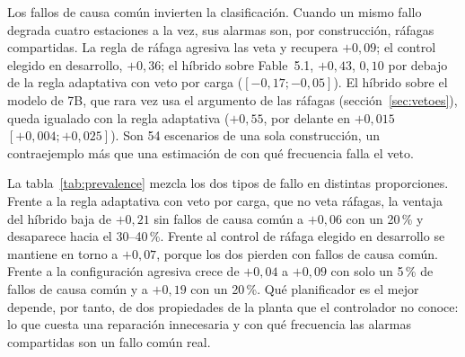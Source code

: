 \documentclass[preprint,11pt]{elsarticle}
\begin{document}
Los fallos de causa común invierten la clasificación. Cuando un mismo fallo degrada cuatro estaciones a la vez, sus alarmas son, por construcción, ráfagas compartidas. La regla de ráfaga agresiva las veta y recupera $+0{,}09$; el control elegido en desarrollo, $+0{,}36$; el híbrido sobre Fable~5.1, $+0{,}43$, $0{,}10$ por debajo de la regla adaptativa con veto por carga ($[-0{,}17; -0{,}05]$). El híbrido sobre el modelo de 7B, que rara vez usa el argumento de las ráfagas (sección~\ref{sec:vetoes}), queda igualado con la regla adaptativa ($+0{,}55$, por delante en $+0{,}015$ $[+0{,}004; +0{,}025]$). Son 54 escenarios de una sola construcción, un contraejemplo más que una estimación de con qué frecuencia falla el veto.

La tabla~\ref{tab:prevalence} mezcla los dos tipos de fallo en distintas proporciones. Frente a la regla adaptativa con veto por carga, que no veta ráfagas, la ventaja del híbrido baja de $+0{,}21$ sin fallos de causa común a $+0{,}06$ con un 20\,\% y desaparece hacia el 30--40\,\%. Frente al control de ráfaga elegido en desarrollo se mantiene en torno a $+0{,}07$, porque los dos pierden con fallos de causa común. Frente a la configuración agresiva crece de $+0{,}04$ a $+0{,}09$ con solo un 5\,\% de fallos de causa común y a $+0{,}19$ con un 20\,\%. Qué planificador es el mejor depende, por tanto, de dos propiedades de la planta que el controlador no conoce: lo que cuesta una reparación innecesaria y con qué frecuencia las alarmas compartidas son un fallo común real.
\end{document}
